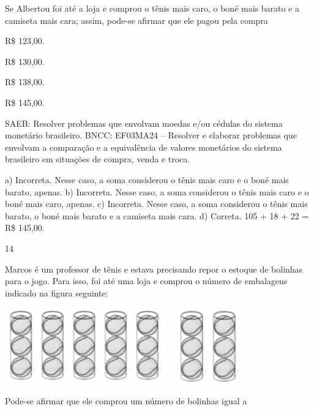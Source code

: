 \begin{multicols}{2}
{\begin{escolha}
{Se Albertou foi até a loja e comprou o tênis mais caro, o boné mais barato e a camiseta mais cara; assim, pode-se afirmar que ele pagou pela compra

\begin{escolha}

\item
  R\$ 123,00.
\item
  R\$ 130,00.
\item
  R\$ 138,00.
\item
  R\$ 145,00.
\end{escolha}

SAEB: Resolver problemas que envolvam moedas e/ou cédulas do sistema monetário brasileiro.
BNCC: EF03MA24 -- Resolver e elaborar problemas que envolvam a comparação e a equivalência de
valores monetários do sistema brasileiro em situações de compra, venda e troca.

a) Incorreta. Nesse caso, a soma considerou o tênis mais caro e o boné mais barato, apenas.
b) Incorreta. Nesse caso, a soma considerou o tênis mais caro e o boné mais caro, apenas.
c) Incorreta. Nesse caso, a soma considerou o tênis mais barato, o boné mais barato e a camiseta mais cara.
d) Correta. 105 + 18 + 22 = R\$ 145,00.

\num{14}

Marcos é um professor de tênis e estava precisando repor o estoque de bolinhas para o jogo. Para isso, foi até uma loja e comprou o número de embalagens indicado na figura seguinte:


\includegraphics[width=2.80882in,height=1.29243in]{media/image139.png}
\includegraphics[width=1.18628in,height=1.28713in]{media/image140.png}

Pode-se afirmar que ele comprou um número de bolinhas igual a

}
\end{escolha}}
\end{multicols}
